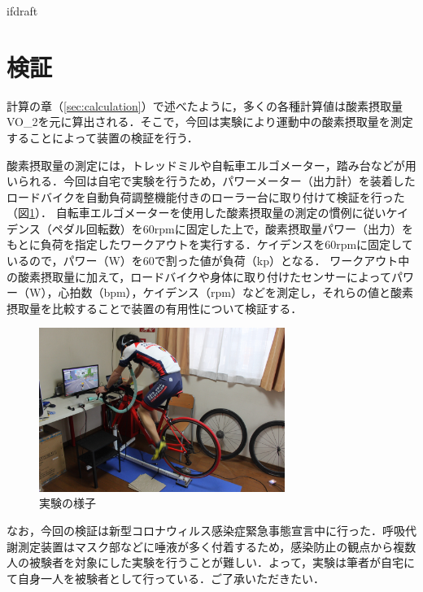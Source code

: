 \expandafter\ifx\csname ifdraft\endcsname\relax
 
\fi

\section{検証}

計算の章（\ref{sec:calculation}）で述べたように，多くの各種計算値は酸素摂取量VO_2を元に算出される．そこで，今回は実験により運動中の酸素摂取量を測定することによって装置の検証を行う．

酸素摂取量の測定には，トレッドミルや自転車エルゴメーター，踏み台などが用いられる．今回は自宅で実験を行うため，パワーメーター（出力計）を装着したロードバイクを自動負荷調整機能付きのローラー台に取り付けて検証を行った（図\ref{fig:bike_in_use}）．
自転車エルゴメーターを使用した酸素摂取量の測定の慣例に従いケイデンス（ペダル回転数）を60rpmに固定した上で，酸素摂取量パワー（出力）をもとに負荷を指定したワークアウトを実行する．ケイデンスを60rpmに固定しているので，パワー（W）を60で割った値が負荷（kp）となる．
ワークアウト中の酸素摂取量に加えて，ロードバイクや身体に取り付けたセンサーによってパワー（W），心拍数（bpm），ケイデンス（rpm）などを測定し，それらの値と酸素摂取量を比較することで装置の有用性について検証する．

\begin{figure}[H]
  \begin{center}
    \includegraphics[width=8cm]{fig/bike_in_use}
    \caption{実験の様子}
    \label{fig:bike_in_use}
  \end{center}
\end{figure}

なお，今回の検証は新型コロナウィルス感染症緊急事態宣言中に行った．呼吸代謝測定装置はマスク部などに唾液が多く付着するため，感染防止の観点から複数人の被験者を対象にした実験を行うことが難しい．よって，実験は筆者が自宅にて自身一人を被験者として行っている．ご了承いただきたい．


